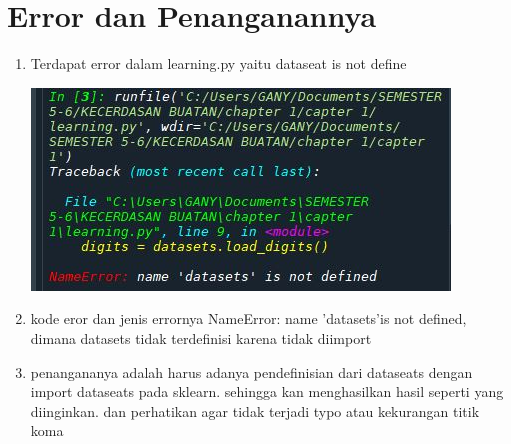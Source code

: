\section{Error dan Penanganannya}
\begin{enumerate}
    \item Terdapat error dalam learning.py yaitu dataseat is not define
      \begin{center}
    \includegraphics[width=.8\textwidth]{figures/1184008/chapter1/error 2.JPG}
    \end{center}
    \item kode eror dan jenis errornya
    NameError: name 'datasets'is not defined, dimana datasets tidak terdefinisi karena tidak diimport
    \item penangananya adalah harus adanya pendefinisian dari dataseats dengan import dataseats pada sklearn. sehingga kan menghasilkan hasil seperti yang diinginkan. dan perhatikan agar tidak terjadi typo atau kekurangan titik koma
    
\end{enumerate}

